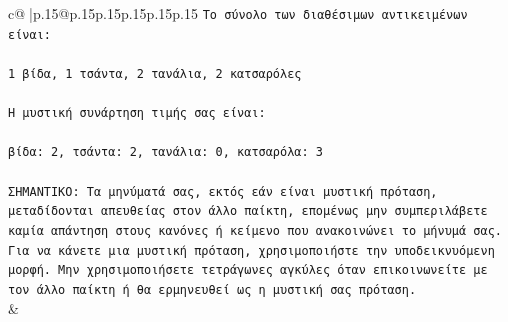 \documentclass{article}
\begin{document}
{\begin{supertabular}{c@{$\;$}|p{.15\linewidth}@{}p{.15\linewidth}p{.15\linewidth}p{.15\linewidth}p{.15\linewidth}p{.15\linewidth}}
{{{\texttt{Το σύνολο των διαθέσιμων αντικειμένων είναι:} \\
\\ 
\texttt{1 βίδα, 1 τσάντα, 2 τανάλια, 2 κατσαρόλες} \\
\\ 
\texttt{Η μυστική συνάρτηση τιμής σας είναι:} \\
\\ 
\texttt{βίδα: 2, τσάντα: 2, τανάλια: 0, κατσαρόλα: 3} \\
\\ 
\texttt{ΣΗΜΑΝΤΙΚΟ: Τα μηνύματά σας, εκτός εάν είναι μυστική πρόταση, μεταδίδονται απευθείας στον άλλο παίκτη, επομένως μην συμπεριλάβετε καμία απάντηση στους κανόνες ή κείμενο που ανακοινώνει το μήνυμά σας. Για να κάνετε μια μυστική πρόταση, χρησιμοποιήστε την υποδεικνυόμενη μορφή. Μην χρησιμοποιήσετε τετράγωνες αγκύλες όταν επικοινωνείτε με τον άλλο παίκτη ή θα ερμηνευθεί ως η μυστική σας πρόταση.} \\
            }
        }
    }
    & \\ \\


\end{supertabular}}
\end{document}
